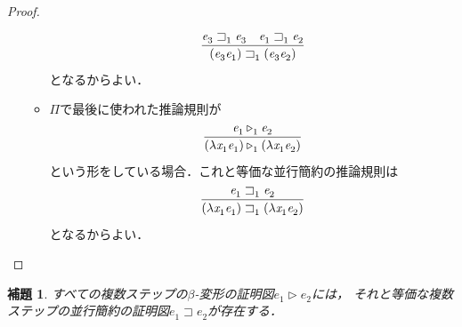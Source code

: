 \documentclass{ltjsbook}%
\newtheorem{lemma}{補題}[section]%
\begin{document}
\begin{proof}
\begin{itemize}
\begin{itemize}
\begin{equation}
      \infer{%
        (\mathit{e}_3^{}\mathit{e}_1^{})\sqsupset_1^{}(\mathit{e}_3^{}\mathit{e}_2^{})%
      }{%
        \mathit{e}_3^{}\sqsupset_1^{}\mathit{e}_3^{}%
      &%
        \mathit{e}_1^{}\sqsupset_1^{}\mathit{e}_2^{}%
      }%
    \end{equation}%
    となるからよい．%
    \item$\Pi$で最後に使われた推論規則が%
    \begin{equation}%
      \infer{%
        (\lambda\mathit{x}_1^{}\mathit{e}_1^{})\triangleright_1^{}%
        (\lambda\mathit{x}_1^{}\mathit{e}_2^{})%
      }{%
        \mathit{e}_1^{}\triangleright_1^{}\mathit{e}_2^{}%
      }%
    \end{equation}%
    という形をしている場合．これと等価な並行簡約の推論規則は%
    \begin{equation}%
      \infer{%
        (\lambda\mathit{x}_1^{}\mathit{e}_1^{})\sqsupset_1^{}%
        (\lambda\mathit{x}_1^{}\mathit{e}_2^{})%
      }{%
        \mathit{e}_1^{}\sqsupset_1^{}\mathit{e}_2^{}%
      }%
    \end{equation}%
    となるからよい．%
    \end{itemize}%
  \end{itemize}%
\end{proof}%
\begin{lemma}%
  \label{lemma:betapar}%
  すべての複数ステップの$\beta$-変形の証明図$\mathit{e}_1^{}\triangleright\mathit{e}_2^{}$には，%
  それと等価な複数ステップの並行簡約の証明図$\mathit{e}_1^{}\sqsupset\mathit{e}_2^{}$が存在する．%
\end{lemma}%
\end{document}
